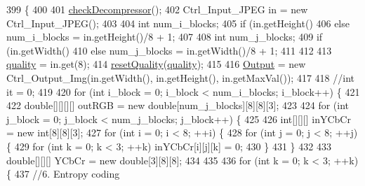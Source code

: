 \begin{DoxyCode}
399                                \{
400 
401         \hyperlink{classdomini_1_1algorithm_1_1Algorithm_a6b738342cc7169893fa60d593f5a13db}{checkDecompressor}();
402         Ctrl\_Input\_JPEG in = \textcolor{keyword}{new} Ctrl\_Input\_JPEG();
403 
404         \textcolor{keywordtype}{int} num\_i\_blocks;
405         \textcolor{keywordflow}{if} (in.getHeight()%
406         \textcolor{keywordflow}{else} num\_i\_blocks = in.getHeight()/8 + 1;
407         
408         \textcolor{keywordtype}{int} num\_j\_blocks;
409         \textcolor{keywordflow}{if} (in.getWidth()%
410         \textcolor{keywordflow}{else} num\_j\_blocks = in.getWidth()/8 + 1;
411 
412 
413         \hyperlink{classdomini_1_1algorithm_1_1JPEG_ae80176d5ff56e613643db55e21c513da}{quality} = in.get(8);
414         \hyperlink{classdomini_1_1algorithm_1_1JPEG_a860d6166ef8edc40b0ffb61942589e5d}{resetQuality}(\hyperlink{classdomini_1_1algorithm_1_1JPEG_ae80176d5ff56e613643db55e21c513da}{quality});
415 
416         \hyperlink{classdomini_1_1algorithm_1_1Algorithm_a4de9955411c656325adc391ef570c082}{Output} = \textcolor{keyword}{new} Ctrl\_Output\_Img(in.getWidth(), in.getHeight(), in.getMaxVal());
417 
418         \textcolor{comment}{//int it = 0;}
419 
420         \textcolor{keywordflow}{for} (\textcolor{keywordtype}{int} i\_block = 0; i\_block < num\_i\_blocks; i\_block++)  \{
421 
422             \textcolor{keywordtype}{double}[][][][] outRGB = \textcolor{keyword}{new} \textcolor{keywordtype}{double}[num\_j\_blocks][8][8][3];
423             
424             \textcolor{keywordflow}{for} (\textcolor{keywordtype}{int} j\_block = 0; j\_block < num\_j\_blocks; j\_block++)  \{
425 
426                 \textcolor{keywordtype}{int}[][][] inYCbCr = \textcolor{keyword}{new} \textcolor{keywordtype}{int}[8][8][3];
427                 \textcolor{keywordflow}{for} (\textcolor{keywordtype}{int} i = 0; i < 8; ++i) \{
428                     \textcolor{keywordflow}{for} (\textcolor{keywordtype}{int} j = 0; j < 8; ++j) \{
429                         \textcolor{keywordflow}{for} (\textcolor{keywordtype}{int} k = 0; k < 3; ++k) inYCbCr[i][j][k] = 0;
430                     \}
431                 \}
432                 
433                 \textcolor{keywordtype}{double}[][][] YCbCr = \textcolor{keyword}{new} \textcolor{keywordtype}{double}[3][8][8];
434 
435                 
436                 \textcolor{keywordflow}{for} (\textcolor{keywordtype}{int} k = 0; k < 3; ++k) \{
437                     \textcolor{comment}{//6. Entropy coding}

\end{DoxyCode}
